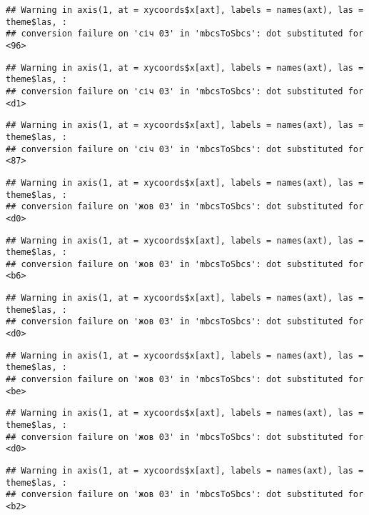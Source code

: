 \documentclass[]{article}
\begin{document}
\begin{verbatim}
## Warning in axis(1, at = xycoords$x[axt], labels = names(axt), las = theme$las, :
## conversion failure on 'січ 03' in 'mbcsToSbcs': dot substituted for <96>
\end{verbatim}

\begin{verbatim}
## Warning in axis(1, at = xycoords$x[axt], labels = names(axt), las = theme$las, :
## conversion failure on 'січ 03' in 'mbcsToSbcs': dot substituted for <d1>
\end{verbatim}

\begin{verbatim}
## Warning in axis(1, at = xycoords$x[axt], labels = names(axt), las = theme$las, :
## conversion failure on 'січ 03' in 'mbcsToSbcs': dot substituted for <87>
\end{verbatim}

\begin{verbatim}
## Warning in axis(1, at = xycoords$x[axt], labels = names(axt), las = theme$las, :
## conversion failure on 'жов 03' in 'mbcsToSbcs': dot substituted for <d0>
\end{verbatim}

\begin{verbatim}
## Warning in axis(1, at = xycoords$x[axt], labels = names(axt), las = theme$las, :
## conversion failure on 'жов 03' in 'mbcsToSbcs': dot substituted for <b6>
\end{verbatim}

\begin{verbatim}
## Warning in axis(1, at = xycoords$x[axt], labels = names(axt), las = theme$las, :
## conversion failure on 'жов 03' in 'mbcsToSbcs': dot substituted for <d0>
\end{verbatim}

\begin{verbatim}
## Warning in axis(1, at = xycoords$x[axt], labels = names(axt), las = theme$las, :
## conversion failure on 'жов 03' in 'mbcsToSbcs': dot substituted for <be>
\end{verbatim}

\begin{verbatim}
## Warning in axis(1, at = xycoords$x[axt], labels = names(axt), las = theme$las, :
## conversion failure on 'жов 03' in 'mbcsToSbcs': dot substituted for <d0>
\end{verbatim}

\begin{verbatim}
## Warning in axis(1, at = xycoords$x[axt], labels = names(axt), las = theme$las, :
## conversion failure on 'жов 03' in 'mbcsToSbcs': dot substituted for <b2>
\end{verbatim}
\end{document}

